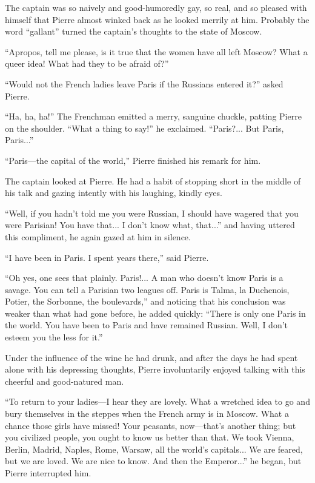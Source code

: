 The captain was so naively and good-humoredly gay, so real, and
so pleased with himself that Pierre almost winked back as he
looked merrily at him. Probably the word ``gallant'' turned the
captain's thoughts to the state of Moscow.

``Apropos, tell me please, is it true that the women have all
left Moscow? What a queer idea! What had they to be afraid of?''

``Would not the French ladies leave Paris if the Russians entered
it?''  asked Pierre.

``Ha, ha, ha!'' The Frenchman emitted a merry, sanguine chuckle,
patting Pierre on the shoulder. ``What a thing to say!'' he
exclaimed. ``Paris?...  But Paris, Paris...''

``Paris---the capital of the world,'' Pierre finished his remark
for him.

The captain looked at Pierre. He had a habit of stopping short in
the middle of his talk and gazing intently with his laughing,
kindly eyes.

``Well, if you hadn't told me you were Russian, I should have
wagered that you were Parisian! You have that... I don't know
what, that...'' and having uttered this compliment, he again
gazed at him in silence.

``I have been in Paris. I spent years there,'' said Pierre.

``Oh yes, one sees that plainly. Paris!... A man who doesn't know
Paris is a savage. You can tell a Parisian two leagues off. Paris
is Talma, la Duchenois, Potier, the Sorbonne, the boulevards,''
and noticing that his conclusion was weaker than what had gone
before, he added quickly: ``There is only one Paris in the
world. You have been to Paris and have remained Russian. Well, I
don't esteem you the less for it.''

Under the influence of the wine he had drunk, and after the days
he had spent alone with his depressing thoughts, Pierre
involuntarily enjoyed talking with this cheerful and good-natured
man.

``To return to your ladies---I hear they are lovely. What a
wretched idea to go and bury themselves in the steppes when the
French army is in Moscow. What a chance those girls have missed!
Your peasants, now---that's another thing; but you civilized
people, you ought to know us better than that. We took Vienna,
Berlin, Madrid, Naples, Rome, Warsaw, all the world's
capitals... We are feared, but we are loved. We are nice to
know. And then the Emperor...'' he began, but Pierre interrupted
him.

